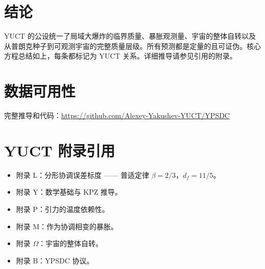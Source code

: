 \documentclass[12pt,a4paper]{article}
\begin{document}
	\section{结论}
	
	YUCT 的公设统一了局域大爆炸的临界质量、暴胀观测量、宇宙的整体自转以及从普朗克种子到可观测宇宙的完整质量层级。所有预测都是定量的且可证伪。核心方程总结如上，每条都标记为 YUCT 关系。详细推导请参见引用的附录。
	
	\section*{数据可用性}
	
	完整推导和代码：\url{https://github.com/Alexey-Yakushev-YUCT/YPSDC}
	
	\section*{YUCT 附录引用}
	\begin{itemize}
		\item 附录 L：分形协调误差标度 —— 普适定律 \(\beta=2/3\)，\(d_f=11/5\)。
		\item 附录 Y：数学基础与 KPZ 推导。
		\item 附录 P：引力的温度依赖性。
		\item 附录 M：作为协调相变的暴胀。
		\item 附录 \(\Omega\)：宇宙的整体自转。
		\item 附录 B：YPSDC 协议。
	\end{itemize}
	
\end{document}
